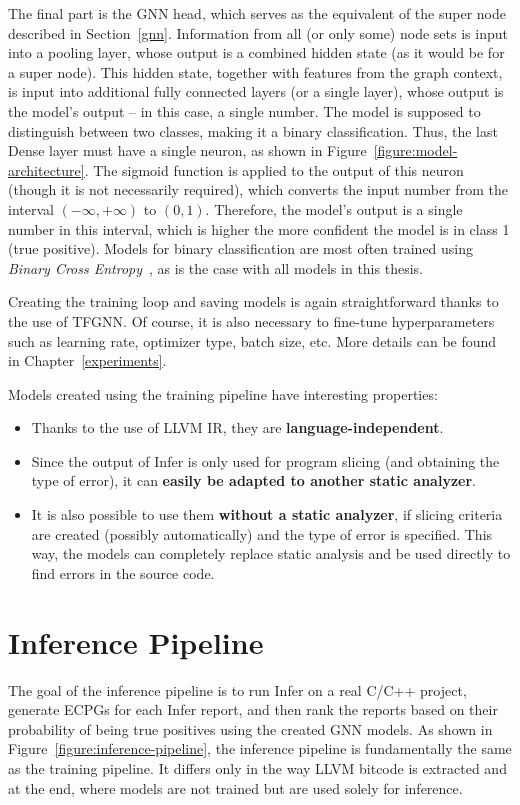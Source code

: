 The final part is the GNN head, which serves as the equivalent of the super node described in Section~\ref{gnn}. Information from all (or only some) node sets is input into a pooling layer, whose output is a combined hidden state (as it would be for a super node). This hidden state, together with features from the graph context, is input into additional fully connected layers (or a single layer), whose output is the model's output -- in this case, a single number. The model is supposed to distinguish between two classes, making it a binary classification. Thus, the last Dense layer must have a single neuron, as shown in Figure~\ref{figure:model-architecture}. The sigmoid function is applied to the output of this neuron (though it is not necessarily required), which converts the input number from the interval $(-\infty,+\infty)$ to $(0,1)$. Therefore, the model's output is a single number in this interval, which is higher the more confident the model is in class 1 (true positive). Models for binary classification are most often trained using \textit{Binary Cross Entropy}~\cite{cross-entropy}, as is the case with all models in this thesis.

Creating the training loop and saving models is again straightforward thanks to the use of TFGNN. Of course, it is also necessary to fine-tune hyperparameters such as learning rate, optimizer type, batch size, etc. More details can be found in Chapter~\ref{experiments}.

Models created using the training pipeline have interesting properties:
\begin{itemize}
    \item Thanks to the use of LLVM IR, they are \textbf{language-independent}.
    \item Since the output of Infer is only used for program slicing (and obtaining the type of error), it can \textbf{easily be adapted to another static analyzer}.
    \item It is also possible to use them \textbf{without a static analyzer}, if slicing criteria are created (possibly automatically) and the type of error is specified. This way, the models can completely replace static analysis and be used directly to find errors in the source code.
\end{itemize}


\section{Inference Pipeline}
\label{inference-pipeline}
The goal of the inference pipeline is to run Infer on a real C/C++ project, generate ECPGs for each Infer report, and then rank the reports based on their probability of being true positives using the created GNN models. As shown in Figure~\ref{figure:inference-pipeline}, the inference pipeline is fundamentally the same as the training pipeline. It differs only in the way LLVM bitcode is extracted and at the end, where models are not trained but are used solely for inference.

